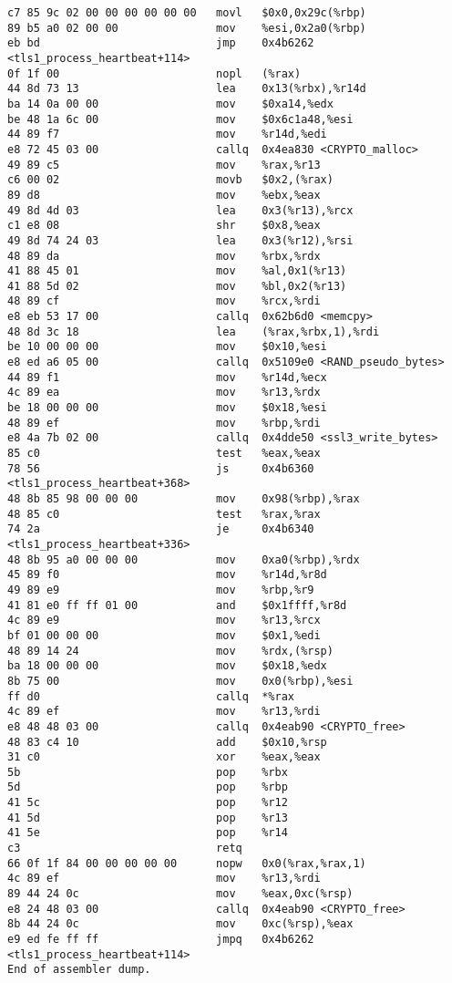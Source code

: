 \begin{lstlisting}
c7 85 9c 02 00 00 00 00 00 00   movl   $0x0,0x29c(%rbp)
89 b5 a0 02 00 00               mov    %esi,0x2a0(%rbp)
eb bd                           jmp    0x4b6262 <tls1_process_heartbeat+114>
0f 1f 00                        nopl   (%rax)
44 8d 73 13                     lea    0x13(%rbx),%r14d
ba 14 0a 00 00                  mov    $0xa14,%edx
be 48 1a 6c 00                  mov    $0x6c1a48,%esi
44 89 f7                        mov    %r14d,%edi
e8 72 45 03 00                  callq  0x4ea830 <CRYPTO_malloc>
49 89 c5                        mov    %rax,%r13
c6 00 02                        movb   $0x2,(%rax)
89 d8                           mov    %ebx,%eax
49 8d 4d 03                     lea    0x3(%r13),%rcx
c1 e8 08                        shr    $0x8,%eax
49 8d 74 24 03                  lea    0x3(%r12),%rsi
48 89 da                        mov    %rbx,%rdx
41 88 45 01                     mov    %al,0x1(%r13)
41 88 5d 02                     mov    %bl,0x2(%r13)
48 89 cf                        mov    %rcx,%rdi
e8 eb 53 17 00                  callq  0x62b6d0 <memcpy>
48 8d 3c 18                     lea    (%rax,%rbx,1),%rdi
be 10 00 00 00                  mov    $0x10,%esi
e8 ed a6 05 00                  callq  0x5109e0 <RAND_pseudo_bytes>
44 89 f1                        mov    %r14d,%ecx
4c 89 ea                        mov    %r13,%rdx
be 18 00 00 00                  mov    $0x18,%esi
48 89 ef                        mov    %rbp,%rdi
e8 4a 7b 02 00                  callq  0x4dde50 <ssl3_write_bytes>
85 c0                           test   %eax,%eax
78 56                           js     0x4b6360 <tls1_process_heartbeat+368>
48 8b 85 98 00 00 00            mov    0x98(%rbp),%rax
48 85 c0                        test   %rax,%rax
74 2a                           je     0x4b6340 <tls1_process_heartbeat+336>
48 8b 95 a0 00 00 00            mov    0xa0(%rbp),%rdx
45 89 f0                        mov    %r14d,%r8d
49 89 e9                        mov    %rbp,%r9
41 81 e0 ff ff 01 00            and    $0x1ffff,%r8d
4c 89 e9                        mov    %r13,%rcx
bf 01 00 00 00                  mov    $0x1,%edi
48 89 14 24                     mov    %rdx,(%rsp)
ba 18 00 00 00                  mov    $0x18,%edx
8b 75 00                        mov    0x0(%rbp),%esi
ff d0                           callq  *%rax
4c 89 ef                        mov    %r13,%rdi
e8 48 48 03 00                  callq  0x4eab90 <CRYPTO_free>
48 83 c4 10                     add    $0x10,%rsp
31 c0                           xor    %eax,%eax
5b                              pop    %rbx
5d                              pop    %rbp
41 5c                           pop    %r12
41 5d                           pop    %r13
41 5e                           pop    %r14
c3                              retq
66 0f 1f 84 00 00 00 00 00      nopw   0x0(%rax,%rax,1)
4c 89 ef                        mov    %r13,%rdi
89 44 24 0c                     mov    %eax,0xc(%rsp)
e8 24 48 03 00                  callq  0x4eab90 <CRYPTO_free>
8b 44 24 0c                     mov    0xc(%rsp),%eax
e9 ed fe ff ff                  jmpq   0x4b6262 <tls1_process_heartbeat+114>
End of assembler dump.
\end{lstlisting}

